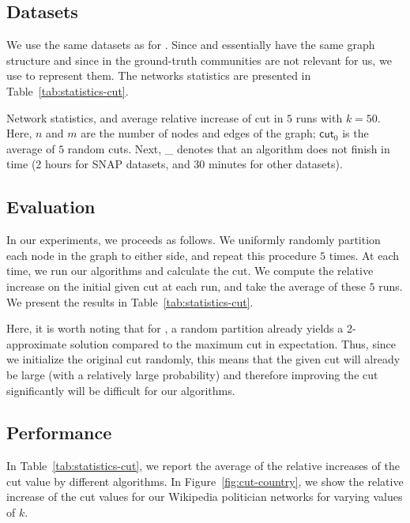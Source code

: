 \subsection{Datasets} 
We use the same datasets as for \dskc. 
Since \dense and \sparse essentially have the same graph structure and since in
\maxcutkc the ground-truth communities are not relevant for us, we use \dense to represent them. 
The networks statistics are presented in Table~\ref{tab:statistics-cut}.

\begin{table*}[t]
	\centering
	\caption{\small{Network statistics, 
	and average relative increase of cut in $5$ runs with $k= 50$. 
	Here, $n$ and $m$ are the number of nodes and edges of the graph; $\mathsf{cut}_0$ is the average of $5$ random cuts.
	Next, \_ denotes that an algorithm does not finish in time (2 hours for SNAP datasets, and 30 minutes for other datasets).}}
	\label{tab:statistics-cut}
	\resizebox{0.85\textwidth}{!}{
		
	}
\end{table*}

\subsection{Evaluation}
In our experiments, we proceeds as follows.
We uniformly randomly partition each node in the graph to either side, and
repeat this procedure $5$ times.  At each time, we run our algorithms and
calculate the cut.  We compute the relative increase on the initial given cut at
each run, and take the average of these $5$ runs. We present the results in
Table~\ref{tab:statistics-cut}. 

Here, it is worth noting that for \maxcut, a random partition already yields a
2-approximate solution compared to the maximum cut in expectation.
Thus, since we initialize the original cut randomly, this means that the given cut
will already be large (with a relatively large probability) and therefore
improving the cut significantly will be difficult for our algorithms.

\subsection{Performance}
In Table~\ref{tab:statistics-cut}, we report the average of the relative
increases of the cut value by different algorithms. 
In Figure~\ref{fig:cut-country}, we show the relative increase of the cut values for 
our Wikipedia politician networks for varying values of $k$. 


